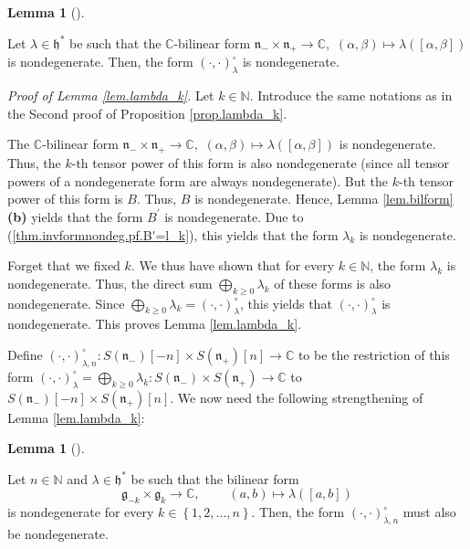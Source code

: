 \documentclass
[numbers=enddot,12pt,final,onecolumn,german,notitlepage]{scrartcl}%
\theoremstyle{definition}
\newtheorem{lem}[theo]{Lemma}
\newenvironment{lemma}[1][]
{\begin{lem}[#1]\begin{leftbar}}
{\end{leftbar}\end{lem}}
\begin{document}
\begin{lemma}
\label{lem.lambda_k}Let $\lambda\in\mathfrak{h}^{\ast}$ be such that the
$\mathbb{C}$-bilinear form $\mathfrak{n}_{-}\times\mathfrak{n}_{+}%
\rightarrow\mathbb{C},$ $\left(  \alpha,\beta\right)  \mapsto\lambda\left(
\left[  \alpha,\beta\right]  \right)  $ is nondegenerate. Then, the form
$\left(  \cdot,\cdot\right)  _{\lambda}^{\circ}$ is nondegenerate.
\end{lemma}

\textit{Proof of Lemma \ref{lem.lambda_k}.} Let $k\in\mathbb{N}$. Introduce
the same notations as in the Second proof of Proposition \ref{prop.lambda_k}.

The $\mathbb{C}$-bilinear form $\mathfrak{n}_{-}\times\mathfrak{n}%
_{+}\rightarrow\mathbb{C},$ $\left(  \alpha,\beta\right)  \mapsto
\lambda\left(  \left[  \alpha,\beta\right]  \right)  $ is nondegenerate. Thus,
the $k$-th tensor power of this form is also nondegenerate (since all tensor
powers of a nondegenerate form are always nondegenerate). But the $k$-th
tensor power of this form is $B$. Thus, $B$ is nondegenerate. Hence, Lemma
\ref{lem.bilform} \textbf{(b)} yields that the form $B^{\prime}$ is
nondegenerate. Due to (\ref{thm.invformnondeg.pf.B'=l_k}), this yields that
the form $\lambda_{k}$ is nondegenerate.

Forget that we fixed $k$. We thus have shown that for every $k\in\mathbb{N}$,
the form $\lambda_{k}$ is nondegenerate. Thus, the direct sum $\bigoplus
\limits_{k\geq0}\lambda_{k}$ of these forms is also nondegenerate. Since
$\bigoplus\limits_{k\geq0}\lambda_{k}=\left(  \cdot,\cdot\right)  _{\lambda
}^{\circ}$, this yields that $\left(  \cdot,\cdot\right)  _{\lambda}^{\circ}$
is nondegenerate. This proves Lemma \ref{lem.lambda_k}.

Define $\left(  \cdot,\cdot\right)  _{\lambda,n}^{\circ}:S\left(
\mathfrak{n}_{-}\right)  \left[  -n\right]  \times S\left(  \mathfrak{n}%
_{+}\right)  \left[  n\right]  \rightarrow\mathbb{C}$ to be the restriction of
this form $\left(  \cdot,\cdot\right)  _{\lambda}^{\circ}=\bigoplus
\limits_{k\geq0}\lambda_{k}:S\left(  \mathfrak{n}_{-}\right)  \times S\left(
\mathfrak{n}_{+}\right)  \rightarrow\mathbb{C}$ to $S\left(  \mathfrak{n}%
_{-}\right)  \left[  -n\right]  \times S\left(  \mathfrak{n}_{+}\right)
\left[  n\right]  $. We now need the following strengthening of Lemma
\ref{lem.lambda_k}:

\begin{lemma}
\label{lem.lambda_k.2}Let $n\in\mathbb{N}$ and $\lambda\in\mathfrak{h}^{\ast}$
be such that the bilinear form%
\[
\mathfrak{g}_{-k}\times\mathfrak{g}_{k}\rightarrow\mathbb{C}%
,\ \ \ \ \ \ \ \ \ \ \left(  a,b\right)  \mapsto\lambda\left(  \left[
a,b\right]  \right)
\]
is nondegenerate for every $k\in\left\{  1,2,...,n\right\}  $. Then, the form
$\left(  \cdot,\cdot\right)  _{\lambda,n}^{\circ}$ must also be nondegenerate.
\end{lemma}
\end{document}
